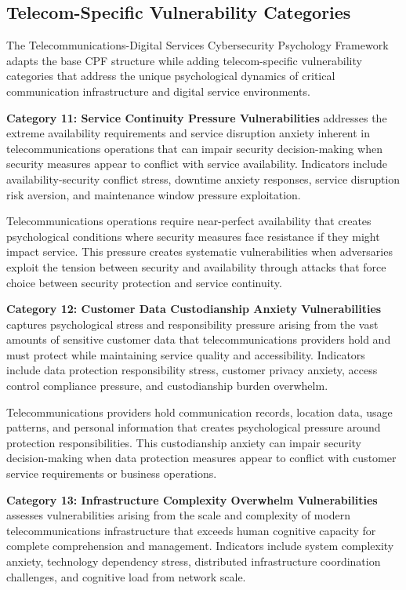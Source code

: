 \documentclass[10pt, twocolumn]{article}
\begin{document}
\subsection{Telecom-Specific Vulnerability Categories}

The Telecommunications-Digital Services Cybersecurity Psychology Framework adapts the base CPF structure while adding telecom-specific vulnerability categories that address the unique psychological dynamics of critical communication infrastructure and digital service environments.

\textbf{Category 11: Service Continuity Pressure Vulnerabilities} addresses the extreme availability requirements and service disruption anxiety inherent in telecommunications operations that can impair security decision-making when security measures appear to conflict with service availability. Indicators include availability-security conflict stress, downtime anxiety responses, service disruption risk aversion, and maintenance window pressure exploitation.

Telecommunications operations require near-perfect availability that creates psychological conditions where security measures face resistance if they might impact service. This pressure creates systematic vulnerabilities when adversaries exploit the tension between security and availability through attacks that force choice between security protection and service continuity.

\textbf{Category 12: Customer Data Custodianship Anxiety Vulnerabilities} captures psychological stress and responsibility pressure arising from the vast amounts of sensitive customer data that telecommunications providers hold and must protect while maintaining service quality and accessibility. Indicators include data protection responsibility stress, customer privacy anxiety, access control compliance pressure, and custodianship burden overwhelm.

Telecommunications providers hold communication records, location data, usage patterns, and personal information that creates psychological pressure around protection responsibilities. This custodianship anxiety can impair security decision-making when data protection measures appear to conflict with customer service requirements or business operations.

\textbf{Category 13: Infrastructure Complexity Overwhelm Vulnerabilities} assesses vulnerabilities arising from the scale and complexity of modern telecommunications infrastructure that exceeds human cognitive capacity for complete comprehension and management. Indicators include system complexity anxiety, technology dependency stress, distributed infrastructure coordination challenges, and cognitive load from network scale.
\end{document}
